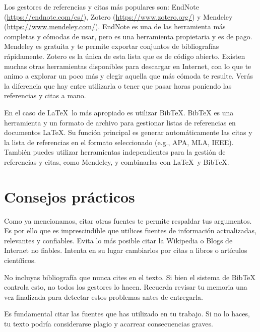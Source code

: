 Los gestores de referencias y citas más populares son: EndNote (\url{https://endnote.com/es/}), Zotero (\url{https://www.zotero.org/}) y Mendeley (\url{https://www.mendeley.com/}). EndNote es una de las herramienta más completas y cómodas de usar, pero es una herramienta propietaria y es de pago. Mendeley es gratuita y te permite exportar conjuntos de bibliografías rápidamente. Zotero es la única de esta lista que es de código abierto. Existen muchas otras herramientas disponibles para descargar en Internet, con lo que te animo a explorar un poco más y elegir aquella que más cómoda te resulte. Verás la diferencia que hay entre utilizarla o tener que pasar horas poniendo las referencias y citas a mano.

En el caso de \LaTeX\ lo más apropiado es utilizar BibTeX. BibTeX es una herramienta y un formato de archivo para gestionar listas de referencias en documentos \LaTeX. Su función principal es generar automáticamente las citas y la lista de referencias en el formato seleccionado (e.g., APA, MLA, IEEE). También puedes utilizar herramientas independientes para la gestión de referencias y citas, como Mendeley, y combinarlas con \LaTeX\ y BibTeX.

\section{Consejos prácticos}

Como ya mencionamos, citar otras fuentes te permite respaldar tus argumentos. Es por ello que es imprescindible que utilices fuentes de información actualizadas, relevantes y confiables. Evita lo más posible citar la Wikipedia o Blogs de Internet no fiables. Intenta en su lugar cambiarlos por citas a libros o artículos científicos.


No incluyas bibliografía que nunca cites en el texto. Si bien el sistema de BibTeX controla esto, no todos los gestores lo hacen. Recuerda revisar tu memoria una vez finalizada para detectar estos problemas antes de entregarla.

Es fundamental citar las fuentes que has utilizado en tu trabajo. Si no lo haces, tu texto podría considerarse plagio y acarrear consecuencias graves.

